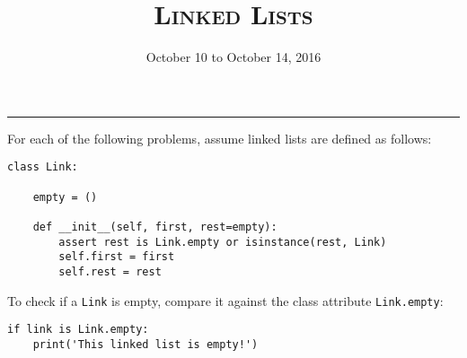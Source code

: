 \documentclass{exam}
\title{\textsc{Linked Lists}}
\date{October 10 to October 14, 2016}
\begin{document}
\maketitle
\rule{\textwidth}{0.15em}
\fontsize{12}{15}\selectfont




\begin{blocksection}
For each of the following problems, assume linked lists are defined as follows:
\newline
\begin{lstlisting}
class Link:

    empty = ()

    def __init__(self, first, rest=empty):
        assert rest is Link.empty or isinstance(rest, Link)
        self.first = first
        self.rest = rest
\end{lstlisting}

To check if a \texttt{Link} is empty, compare it against the class attribute \texttt{Link.empty}:
\newline
\begin{lstlisting}
if link is Link.empty:
    print('This linked list is empty!')
\end{lstlisting}
\end{blocksection}
\end{document}
